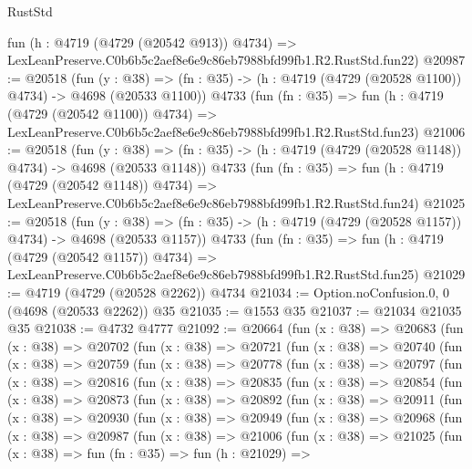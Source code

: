 \begin{lexlean}{RustStd}
\begin{coremodule}
    fun (h : @4719 (@4729 (@20542 @913)) @4734) =>
    LexLeanPreserve.C0b6b5c2aef8e6e9c86eb7988bfd99fb1.R2.RustStd.fun22)
@20987 := @20518
    (fun (y : @38) =>
    (fn : @35) -> (h : @4719 (@4729 (@20528 @1100)) @4734) -> @4698 (@20533 @1100))
    @4733
    (fun (fn : @35) =>
    fun (h : @4719 (@4729 (@20542 @1100)) @4734) =>
    LexLeanPreserve.C0b6b5c2aef8e6e9c86eb7988bfd99fb1.R2.RustStd.fun23)
@21006 := @20518
    (fun (y : @38) =>
    (fn : @35) -> (h : @4719 (@4729 (@20528 @1148)) @4734) -> @4698 (@20533 @1148))
    @4733
    (fun (fn : @35) =>
    fun (h : @4719 (@4729 (@20542 @1148)) @4734) =>
    LexLeanPreserve.C0b6b5c2aef8e6e9c86eb7988bfd99fb1.R2.RustStd.fun24)
@21025 := @20518
    (fun (y : @38) =>
    (fn : @35) -> (h : @4719 (@4729 (@20528 @1157)) @4734) -> @4698 (@20533 @1157))
    @4733
    (fun (fn : @35) =>
    fun (h : @4719 (@4729 (@20542 @1157)) @4734) =>
    LexLeanPreserve.C0b6b5c2aef8e6e9c86eb7988bfd99fb1.R2.RustStd.fun25)
@21029 := @4719 (@4729 (@20528 @2262)) @4734
@21034 := Option.noConfusion.{0, 0} (@4698 (@20533 @2262)) @35
@21035 := @1553 @35
@21037 := @21034 @21035 @35
@21038 := @4732 @4777
@21092 := @20664
    (fun (x : @38) =>
    @20683
      (fun (x : @38) =>
      @20702
        (fun (x : @38) =>
        @20721
          (fun (x : @38) =>
          @20740
            (fun (x : @38) =>
            @20759
              (fun (x : @38) =>
              @20778
                (fun (x : @38) =>
                @20797
                  (fun (x : @38) =>
                  @20816
                    (fun (x : @38) =>
                    @20835
                      (fun (x : @38) =>
                      @20854
                        (fun (x : @38) =>
                        @20873
                          (fun (x : @38) =>
                          @20892
                            (fun (x : @38) =>
                            @20911
                              (fun (x : @38) =>
                              @20930
                                (fun (x : @38) =>
                                @20949
                                  (fun (x : @38) =>
                                  @20968
                                    (fun (x : @38) =>
                                    @20987
                                      (fun (x : @38) =>
                                      @21006
                                        (fun (x : @38) =>
                                        @21025
                                          (fun (x : @38) =>
                                          fun (fn : @35) =>
                                          fun (h : @21029) =>

\end{coremodule}
\end{lexlean}
